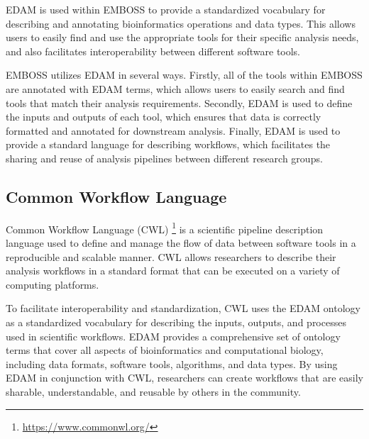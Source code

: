 \documentclass{scrartcl}
\begin{document}
EDAM is used within EMBOSS to provide a standardized vocabulary for describing and annotating 
  bioinformatics operations and data types. 
  This allows users to easily find and use the appropriate tools for their specific analysis needs, 
  and also facilitates interoperability between different software tools.

EMBOSS utilizes EDAM in several ways. Firstly, all of the tools within EMBOSS are annotated with EDAM terms, 
  which allows users to easily search and find tools that match their analysis requirements. 
  Secondly, EDAM is used to define the inputs and outputs of each tool, which ensures that data is correctly 
  formatted and annotated for downstream analysis. Finally, EDAM is used to provide a standard language for 
  describing workflows, which facilitates the sharing and reuse of analysis pipelines between 
  different research groups.


  

\subsection{Common Workflow Language}

Common Workflow Language (CWL) \cite{cwl} \footnote{\url{https://www.commonwl.org/}} is a scientific pipeline description language used to define and manage the 
  flow of data between software tools in a reproducible and scalable manner. CWL allows researchers to 
  describe their analysis workflows in a standard format that can be executed on a variety of computing 
  platforms.

To facilitate interoperability and standardization, CWL uses the EDAM ontology as a standardized 
  vocabulary for describing the inputs, outputs, and processes used in scientific workflows. 
  EDAM provides a comprehensive set of ontology terms that cover all aspects of bioinformatics and 
  computational biology, including data formats, software tools, algorithms, and data types. 
  By using EDAM in conjunction with CWL, researchers can create workflows that are easily sharable, 
  understandable, and reusable by others in the community.


\newpage
{}
\printbibliography %
\end{document}
